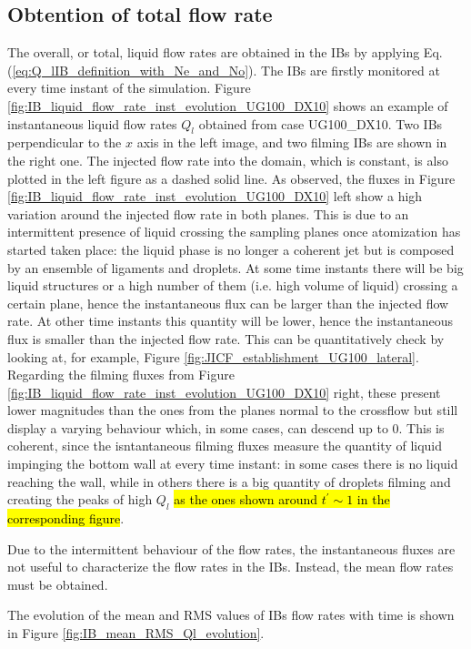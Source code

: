 \subsection{Obtention of total flow rate}

The overall, or total, liquid flow rates are obtained in the IBs by applying Eq. (\ref{eq:Q_lIB_definition_with_Ne_and_No}). The IBs are firstly monitored at every time instant of the simulation. Figure \ref{fig:IB_liquid_flow_rate_inst_evolution_UG100_DX10} shows an example of instantaneous liquid flow rates $Q_l$ obtained from case UG100\_DX10. Two IBs perpendicular to the $x$ axis in the left image, and two filming IBs are shown in the right one. The injected flow rate into the domain, which is constant, is also plotted in the left figure as a dashed solid line. As observed, the fluxes in Figure \ref{fig:IB_liquid_flow_rate_inst_evolution_UG100_DX10} left show a high variation around the injected flow rate in both planes. This is due to an intermittent presence of liquid crossing the sampling planes once atomization has started taken place: the liquid phase is no longer a coherent jet but is composed by an ensemble of ligaments and droplets. At some time instants there will be big liquid structures or a high number of them (i.e. high volume of liquid) crossing a certain plane, hence the instantaneous flux can be larger than the injected flow rate. At other time instants this quantity will be lower, hence the instantaneous flux is smaller than the injected flow rate. This can be quantitatively check by looking at, for example, Figure \ref{fig:JICF_establishment_UG100_lateral}. Regarding the filming fluxes from Figure \ref{fig:IB_liquid_flow_rate_inst_evolution_UG100_DX10} right, these present lower magnitudes than the ones from the planes normal to the crossflow but still display a varying behaviour which, in some cases, can descend up to $0$. This is coherent, since the isntantaneous filming fluxes measure the quantity of liquid impinging the bottom wall at every time instant: in some cases there is no liquid reaching the wall, while in others there is a big quantity of droplets filming and creating the peaks of high $Q_l$ \hl{as the ones shown around $t^{\prime} \sim 1$ in the corresponding figure}.

Due to the intermittent behaviour of the flow rates, the instantaneous fluxes are not useful to characterize the flow rates in the IBs. Instead, the mean flow rates must be obtained. 

The evolution of the mean and RMS values of IBs flow rates with time is shown in Figure \ref{fig:IB_mean_RMS_Ql_evolution}.

